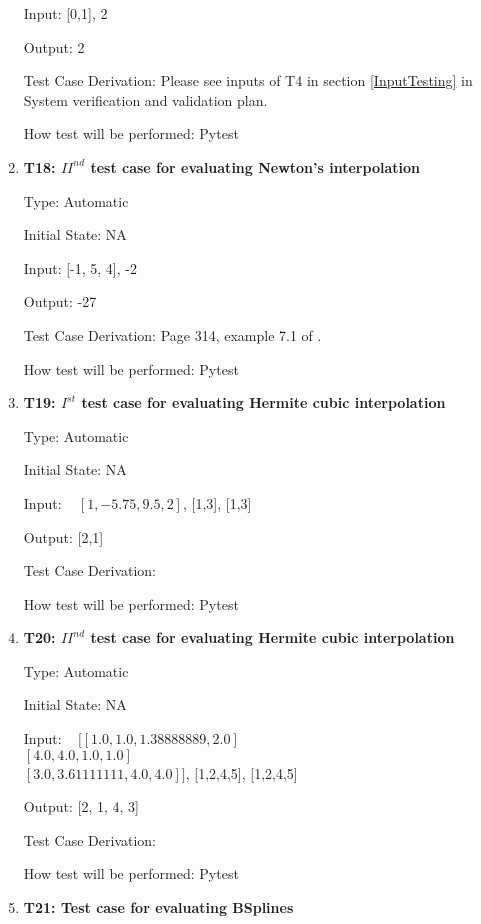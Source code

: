 \documentclass[12pt, titlepage]{article}
\begin{document}
\begin{enumerate}
Input: [0,1], 2 

Output: 2

Test Case Derivation: Please see inputs of T4 in section \ref{InputTesting} in 
System verification and validation plan. 

How test will be performed: Pytest

\item{\textbf{T18: ${II}^{nd}$ test case for evaluating Newton's interpolation}}

Type: Automatic

Initial State: NA 

Input: [-1, 5, 4], -2 

Output: -27

Test Case Derivation: Page 314, example 7.1 of \cite{Health1997}. 

How test will be performed: Pytest



\item{\textbf{T19: $I^{st}$ test case for evaluating Hermite cubic 
interpolation}}

Type: Automatic

Initial State: NA 

Input: ~\newline 
$[1,-5.75, 9.5, 2]$, [1,3], [1,3]						

Output: [2,1]

Test Case Derivation: \cite{HermiteCubic2}

How test will be performed: Pytest

\item{\textbf{T20: ${II}^{nd}$ test case for evaluating Hermite cubic 
interpolation}}

Type: Automatic

Initial State: NA 

Input: ~\newline 
$[[1.0,1.0, 1.38888889, 2.0]$\\
$[4.0, 4.0, 1.0, 1.0]$\\
$[3.0, 3.61111111, 4.0, 4.0]]$, [1,2,4,5], [1,2,4,5]					

Output: [2, 1, 4, 3]

Test Case Derivation: \cite{HermiteCubic2}

How test will be performed: Pytest

\item{\textbf{T21: Test case for evaluating BSplines}}


\end{enumerate}
\end{document}

